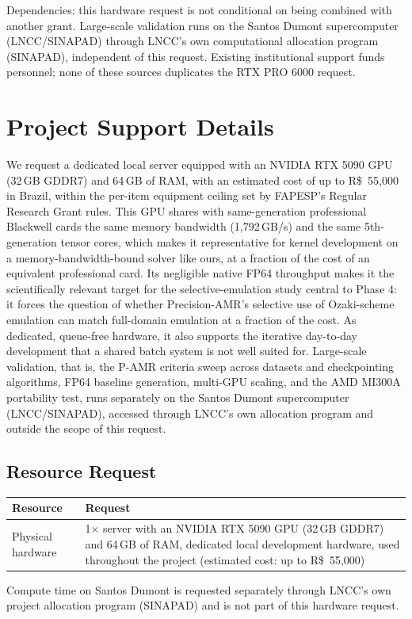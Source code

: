 \documentclass[12pt,a4paper]{article}
\newcommand{\pamr}{P\nobreakdash-AMR}
\begin{document}
Dependencies: this hardware request is not conditional on being combined with
another grant. Large-scale validation runs on the Santos Dumont supercomputer
(LNCC/SINAPAD) through LNCC's own computational allocation program (SINAPAD),
independent of this request. Existing institutional support funds personnel; none
of these sources duplicates the RTX PRO 6000 request.

\fi

\section{Project Support Details}

We request a dedicated local server equipped with an NVIDIA RTX 5090 GPU
(32\,GB GDDR7) and 64\,GB of RAM, with an estimated cost of up to
R\$~55,000 in Brazil, within the per-item equipment ceiling set by
FAPESP's Regular Research Grant rules. This GPU shares with same-generation
professional Blackwell cards the same memory bandwidth (1,792\,GB/s) and
the same 5th-generation tensor cores, which makes it representative for
kernel development on a memory-bandwidth-bound solver like ours, at a
fraction of the cost of an equivalent professional card. Its negligible
native FP64 throughput makes it the scientifically relevant target for the
selective-emulation study central to Phase 4: it forces the question of
whether Precision-AMR's selective use of Ozaki-scheme emulation can match
full-domain emulation at a fraction of the cost. As dedicated, queue-free
hardware, it also supports the iterative day-to-day development that a
shared batch system is not well suited for. Large-scale validation, that
is, the \pamr{} criteria sweep across datasets and checkpointing
algorithms, FP64 baseline generation, multi-GPU scaling, and the AMD
MI300A portability test, runs separately on the Santos Dumont
supercomputer (LNCC/SINAPAD), accessed through LNCC's own allocation
program and outside the scope of this request.

\subsection*{Resource Request}

\begin{longtable}{@{}p{}p{}@{}}
\toprule
\textbf{Resource} & \textbf{Request}\\
\midrule
\endhead
\bottomrule
\endfoot
Physical hardware & 1$\times$ server with an NVIDIA RTX 5090 GPU (32\,GB
GDDR7) and 64\,GB of RAM, dedicated local development hardware, used
throughout the project (estimated cost: up to R\$~55,000)\\
\end{longtable}

Compute time on Santos Dumont is requested separately through LNCC's own project
allocation program (SINAPAD) and is not part of this hardware request.



\end{document}
